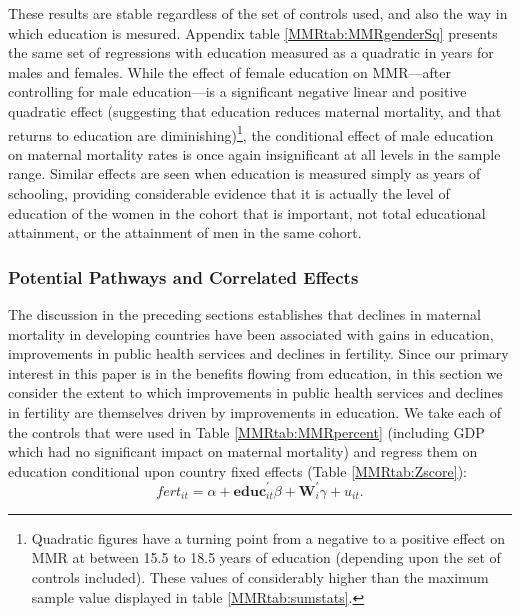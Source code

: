 \documentclass{article}[12pt,subeqn]
\begin{document}
\begin{spacing}{1.4}
These results are stable regardless of the set of controls used, and also the
way in which education is mesured.  Appendix table \ref{MMRtab:MMRgenderSq} 
presents the same set of regressions with education measured as a quadratic
in years for males and females.  While the effect of female education on 
MMR---after controlling for male education---is a significant negative linear 
and positive quadratic effect (suggesting that education reduces maternal 
mortality, and that returns to education are diminishing)\footnote{Quadratic 
figures have a turning point from a negative to a positive effect on MMR at 
between 15.5 to 18.5 years of education (depending upon the set of controls 
included).  These values of considerably higher than the maximum sample value 
displayed in table \ref{MMRtab:sumstats}.}, the conditional effect of male 
education on maternal mortality rates is once again insignificant at all
levels in the sample range.  Similar effects are seen when education is
measured simply as years of schooling, providing considerable evidence that
it is actually the level of education of the women in the cohort that is 
important, not total educational attainment, or the attainment of men in the 
same cohort.


\subsubsection{Potential Pathways and Correlated Effects}
\label{ssscn:effects}
The discussion in the preceding sections establishes that declines in maternal 
mortality in developing countries have been associated with gains in education, 
improvements in public health services and declines in fertility. Since our 
primary interest in this paper is in the benefits flowing from education, in this 
section we consider the extent to which improvements in public health services and 
declines in fertility are themselves driven by improvements in education. We take 
each of the controls that were used in Table \ref{MMRtab:MMRpercent} (including 
GDP which had no significant impact on maternal mortality) and regress them on 
education conditional upon country fixed effects (Table \ref{MMRtab:Zscore}):
\begin{equation}
\label{eqn:Zscore}
  fert_{it}=\alpha + \mathbf{educ}^\prime_{it}\beta + \mathbf{W}^\prime_i\gamma 
  + u_{it}.
\end{equation}


\end{spacing}
\end{document}
